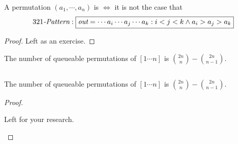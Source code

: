\begin{frame}
  \begin{theorem}
     A permutation $(a_1, \cdots, a_n)$ is  $\iff$ it is not the case that
     \[
       321\text{\it -Pattern}: \fbox{$\texttt{\it out} = \cdots a_i \cdots a_j \cdots a_k: i < j < k \land a_i > a_j > a_k$}
     \]
  \end{theorem}

  \pause
  \vspace{0.30cm}
  \begin{proof}
    \centerline{\Large Left as an exercise.}
  \end{proof}
\end{frame}

\begin{frame}{}
  \begin{theorem}
    The number of queueable permutations of $[1 \cdots n]$ is ${2n \choose n} - {2n \choose n-1}$.
  \end{theorem}

  \vspace{0.20cm}
  \begin{columns}
    \pause
    \pause
  \end{columns}
\end{frame}

\begin{frame}{}
  \begin{theorem}
    The number of queueable permutations of $[1 \cdots n]$ is ${2n \choose n} - {2n \choose n-1}$.
  \end{theorem}

  \vspace{0.30cm}
  \begin{proof}
    \begin{center}
      {\Large Left for your research.}
    \end{center}

    \pause
  \end{proof}
\end{frame}

